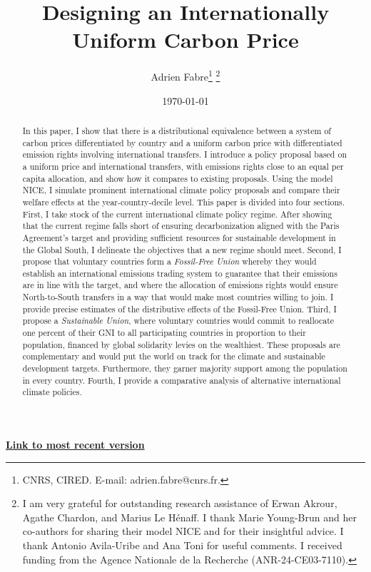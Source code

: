 \documentclass[12pt,english]{article}
\title{Designing an Internationally Uniform Carbon Price}
\author{Adrien Fabre\footnote{CNRS, CIRED. E-mail: adrien.fabre@cnrs.fr.} \footnote{I am very grateful for outstanding research assistance of Erwan Akrour, Agathe Chardon, and Marius Le Hénaff. I thank Marie Young-Brun and her co-authors for sharing their model NICE and for their insightful advice. I thank Antonio Avila-Uribe and Ana Toni for useful comments. I received funding from the Agence Nationale de la Recherche (ANR-24-CE03-7110).}}
\date{\today} %
\newcommand{\bo}[1]{\textbf{#1}}
\begin{document}
\sloppy
\maketitle

\vspace{-1cm}
\begin{center}
{\bo{\href{https://github.com/bixiou/global_tax_attitudes/raw/main/paper/uniform_price.pdf}{Link to most recent version}}}
\end{center}


\begin{abstract}

In this paper, I show that there is a distributional equivalence between a system of carbon prices differentiated by country and a uniform carbon price with differentiated emission rights involving international transfers. I introduce a policy proposal based on a uniform price and international transfers, with emissions rights close to an equal per capita allocation, and show how it compares to existing proposals. Using the model NICE, I simulate prominent international climate policy proposals and compare their welfare effects at the year-country-decile level. 
This paper is divided into four sections. First, I take stock of the current international climate policy regime. After showing that the current regime falls short of ensuring decarbonization aligned with the Paris Agreement's target and providing sufficient resources for sustainable development in the Global South, I delineate the objectives that a new regime should meet. Second, I propose that voluntary countries form a \textit{Fossil-Free Union} whereby they would establish an international emissions trading system to guarantee that their emissions are in line with the target, and where the allocation of emissions rights would ensure North-to-South transfers in a way that would make most countries willing to join. I provide precise estimates of the distributive effects of the Fossil-Free Union. Third, I propose a \textit{Sustainable Union}, where voluntary countries would commit to reallocate one percent of their GNI to all participating countries in proportion to their population, financed by global solidarity levies on the wealthiest. These proposals are complementary and would put the world on track for the climate and sustainable development targets. Furthermore, they garner majority support among the population in every country. Fourth, I provide a comparative analysis of alternative international climate policies.


\end{abstract}
\end{document}
